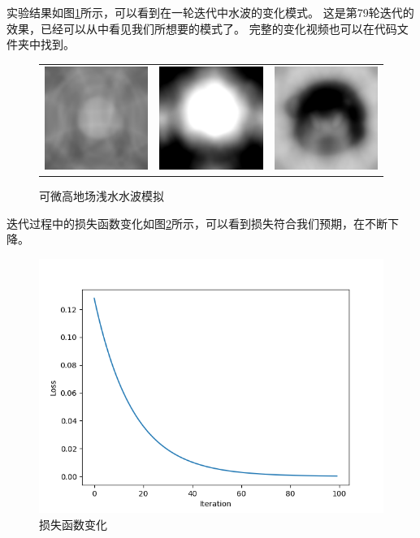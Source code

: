 \documentclass[thesis]{thesis}
\begin{document}
实验结果如图\ref{fig:difftaichi}所示，可以看到在一轮迭代中水波的变化模式。
这是第79轮迭代的效果，已经可以从中看见我们所想要的模式了。
完整的变化视频也可以在代码文件夹中找到。
\begin{figure}[!ht]
\centering
\begin{tabular}{ccc}
\includegraphics[width=0.33\linewidth]{fig/erythrocyte1.png}&
\includegraphics[width=0.33\linewidth]{fig/erythrocyte2.png}&
\includegraphics[width=0.33\linewidth]{fig/erythrocyte3.png}
\end{tabular}
\caption{可微高地场浅水水波模拟}
\label{fig:difftaichi}
\end{figure}

迭代过程中的损失函数变化如图\ref{fig:loss}所示，可以看到损失符合我们预期，在不断下降。
\begin{figure}[H]
\centering
\includegraphics[width=0.5\linewidth]{fig/loss.png}
\caption{损失函数变化}
\label{fig:loss}
\end{figure}
\end{document}
